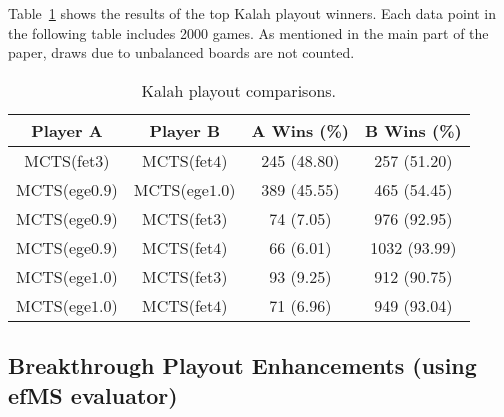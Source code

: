 \documentclass{article}
\begin{document}



Table~\ref{tbl:kalah-toptourney} shows the results of the top Kalah playout winners.
Each data point in the following table includes 2000 games. As mentioned in the main part of the paper, draws due to unbalanced 
boards are not counted. 

\begin{table}[h!]
\begin{center}
\begin{tabular}{|c|c|cc|}
\hline
Player A & Player B                  & A Wins (\%)  & B Wins (\%)   \\ 
\hline
MCTS(fet$3$)   & MCTS(fet$4$)        & 245 (48.80)   & 257 (51.20)    \\
MCTS(ege$0.9$) & MCTS(ege$1.0$)      & 389 (45.55)   & 465 (54.45)    \\
\hline
MCTS(ege$0.9$) & MCTS(fet$3$)        &  74 (7.05)   & 976 (92.95)    \\
MCTS(ege$0.9$) & MCTS(fet$4$)        &  66 (6.01)   & 1032 (93.99)    \\
MCTS(ege$1.0$) & MCTS(fet$3$)        &  93 (9.25)   & 912 (90.75)    \\
MCTS(ege$1.0$) & MCTS(fet$4$)        &  71 (6.96)   & 949 (93.04)    \\
\hline
\end{tabular}
\end{center}
\caption{Kalah playout comparisons. \label{tbl:kalah-toptourney}}
\end{table}

\subsection{Breakthrough Playout Enhancements (using efMS evaluator)}
\end{document}
